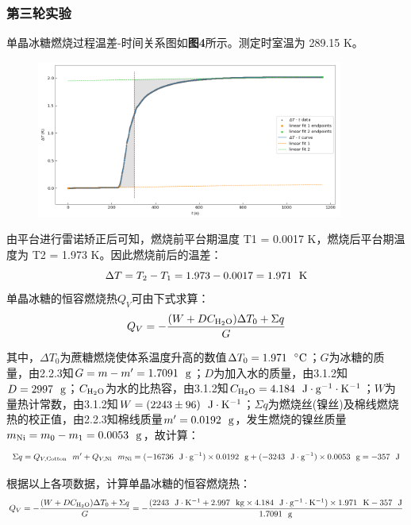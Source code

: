 \documentclass[12pt]{article}
\begin{document}
			\subsubsection{第三轮实验}
			单晶冰糖燃烧过程温差-时间关系图如\textbf{图4}所示。测定时室温为 289.15 K。\par
			\begin{figure}[h]
				\centering
				\includegraphics[width=0.9\textwidth]{4.png}
			\end{figure}
			由平台进行雷诺矫正后可知，燃烧前平台期温度 T1 = 0.0017 K，燃烧后平台期温度为 T2 = 1.973 K。因此燃烧前后的温差：
			\begin{equation}
				\Delta T = T_{2}-T_{1} = 1.973-0.0017 = 1.971\ \ {\rm K}
			\end{equation}
			单晶冰糖的恒容燃烧热$Q_{V}$可由下式求算：
			$$
			Q_{V}=-\frac{(W+DC_{\rm H_{2}O})\Delta T_{0}+\Sigma q}{G}
			$$
			\par
			其中，$\Delta T_{0}$为蔗糖燃烧使体系温度升高的数值$\Delta T_{0}=1.971\ \ {\rm ^{\circ}C}$；$G$为冰糖的质量，由2.2.3知$G=m-m^{\prime}=1.7091\ \ {\rm g}$；$D$为加入水的质量，由3.1.2知$D=2997\ \ {\rm g}$；$C_{\rm H_{2}O}$为水的比热容，由3.1.2知$C_{\rm H_{2}O}=4.184\ \ {\rm J\cdot g^{-1} \cdot K^{-1}}$；$W$为量热计常数，由3.1.2知$W=(2243\pm 96)\ \ {\rm J\cdot K^{-1}}$；$\Sigma q$为燃烧丝(镍丝)及棉线燃烧热的校正值，由2.2.3知棉线质量$m^{\prime}=0.0192\ \ {\rm g}$，发生燃烧的镍丝质量$m_{\rm Ni}=m_{0}-m_{1}=0.0053\ \ {\rm g}$，故计算：
			$$
			\Sigma q=Q_{V, {\rm Cotton}} \ \ m^{\prime}+Q_{V, {\rm Ni}} \ \ m_{\rm Ni}=(-16736\ \ {\rm J\cdot g^{-1}})\times 0.0192\ \ {\rm g}+(-3243\ \ {\rm J\cdot g^{-1}})\times 0.0053\ \ {\rm g}=-357\ \ {\rm J}
			$$
			\par
			根据以上各项数据，计算单晶冰糖的恒容燃烧热：
			$$
			Q_{V}=-\frac{(W+DC_{\rm H_{2}O})\Delta T_{0}+\Sigma q}{G}=-\frac{(2243\ \ {\rm J\cdot K^{-1}}+2.997\ \ {\rm kg}\times 4.184\ \ {\rm J\cdot g^{-1}\cdot K^{-1}})\times 1.971\ \ {\rm K}-357\ \ {\rm J}}{1.7091\ \ {\rm g}}
			$$
\end{document}
